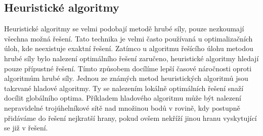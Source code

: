 \subsection{Heuristické algoritmy}
Heuristické algoritmy se velmi podobají metodě hrubé síly, pouze
nezkoumají všechna možná řešení. Tato technika je velmi často
používaná u optimalizačních úloh, kde neexistuje exaktní
řešení. Zatímco u algoritmu řešícího úlohu metodou hrubé síly bylo
nalezení optimálního řešení zaručeno, heuristické algoritmy hledají
pouze přípustné řešení. Tímto způsobem docílíme lepší časové
náročnosti oproti algoritmům hrubé síly. Jednou ze známých metod
heuristických algoritmů jsou takzvané hladové algoritmy. Ty se
nalezením lokálně optimálních řešení snaží docílit globálního
optima. Příkladem hladového algoritmu může být nalezení nepravidelné
trojúhelníkové sítě nad množinou bodů v rovině, kdy postupně přidáváme
do řešení nejkratší hrany, pokud ovšem nekříží jinou hranu vyskytující
se již v řešení.
	
